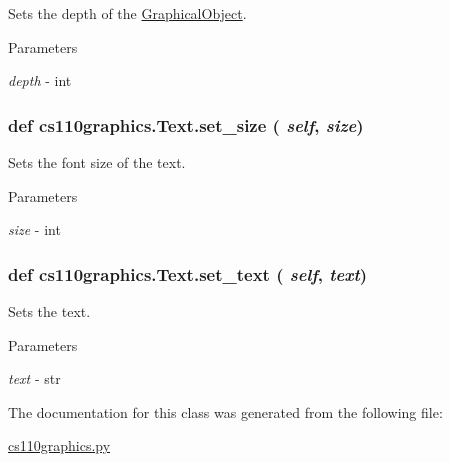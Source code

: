 Sets the depth of the \hyperlink{classcs110graphics_1_1GraphicalObject}{GraphicalObject}. 
\begin{DoxyParams}{Parameters}
\item[{\em depth}]-\/ int \end{DoxyParams}
\hypertarget{classcs110graphics_1_1Text_ad470aa26235fc2f5f1459c3750251207}{
\subsubsection[{set\_\-size}]{\setlength{\rightskip}{0pt plus 5cm}def cs110graphics.Text.set\_\-size ( {\em self}, \/   {\em size})}}
\label{classcs110graphics_1_1Text_ad470aa26235fc2f5f1459c3750251207}


Sets the font size of the text. 
\begin{DoxyParams}{Parameters}
\item[{\em size}]-\/ int \end{DoxyParams}
\hypertarget{classcs110graphics_1_1Text_ab12aa7478ca6a2b2015b7e8544674c73}{
\subsubsection[{set\_\-text}]{\setlength{\rightskip}{0pt plus 5cm}def cs110graphics.Text.set\_\-text ( {\em self}, \/   {\em text})}}
\label{classcs110graphics_1_1Text_ab12aa7478ca6a2b2015b7e8544674c73}


Sets the text. 
\begin{DoxyParams}{Parameters}
\item[{\em text}]-\/ str \end{DoxyParams}


The documentation for this class was generated from the following file:\begin{DoxyCompactItemize}
\item 
\hyperlink{cs110graphics_8py}{cs110graphics.py}\end{DoxyCompactItemize}
